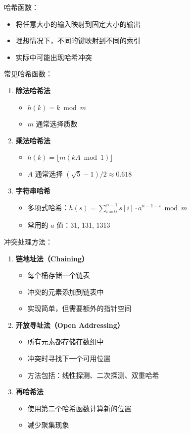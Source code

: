哈希函数：
\begin{itemize}
  \item 将任意大小的输入映射到固定大小的输出
  \item 理想情况下，不同的键映射到不同的索引
  \item 实际中可能出现哈希冲突
\end{itemize}

常见哈希函数：
\begin{enumerate}
  \item \textbf{除法哈希法}
    \begin{itemize}
      \item $h(k) = k \bmod m$
      \item $m$ 通常选择质数
    \end{itemize}

  \item \textbf{乘法哈希法}
    \begin{itemize}
      \item $h(k) = \lfloor m(kA \bmod 1) \rfloor$
      \item $A$ 通常选择 $(\sqrt{5} - 1)/2 \approx 0.618$
    \end{itemize}

  \item \textbf{字符串哈希}
    \begin{itemize}
      \item 多项式哈希：$h(s) = \sum_{i=0}^{n-1} s[i] \cdot a^{n-1-i} \bmod m$
      \item 常用的 $a$ 值：31, 131, 1313
    \end{itemize}
\end{enumerate}

冲突处理方法：
\begin{enumerate}
  \item \textbf{链地址法（Chaining）}
    \begin{itemize}
      \item 每个桶存储一个链表
      \item 冲突的元素添加到链表中
      \item 实现简单，但需要额外的指针空间
    \end{itemize}

  \item \textbf{开放寻址法（Open Addressing）}
    \begin{itemize}
      \item 所有元素都存储在数组中
      \item 冲突时寻找下一个可用位置
      \item 方法包括：线性探测、二次探测、双重哈希
    \end{itemize}

  \item \textbf{再哈希法}
    \begin{itemize}
      \item 使用第二个哈希函数计算新的位置
      \item 减少聚集现象
    \end{itemize}
\end{enumerate}

